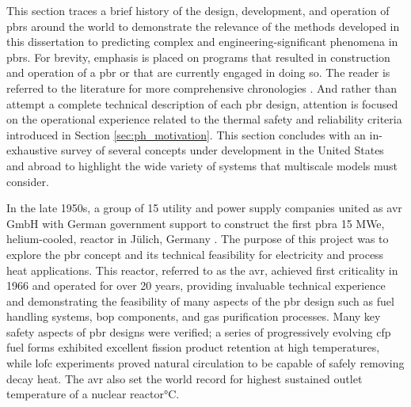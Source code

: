 This section traces a brief history of the design, development, and operation of \glspl{pbr} around the world to demonstrate the relevance of the methods developed in this dissertation to predicting complex and engineering-significant phenomena in \glspl{pbr}. For brevity, emphasis is placed on programs that resulted in construction and operation of a \gls{pbr} or that are currently engaged in doing so. The reader is referred to the literature for more comprehensive chronologies \cite{claxton,thomas}. And rather than attempt a complete technical description of each \gls{pbr} design, attention is focused on the operational experience related to the thermal safety and reliability criteria introduced in Section \ref{sec:ph_motivation}. This section concludes with an in-exhaustive survey of several concepts under development in the United States and abroad to highlight the wide variety of systems that multiscale models must consider.

In the late 1950s, a group of 15 utility and power supply companies united as \gls{avr} GmbH with German government support to construct the first \gls{pbr}\mdash a 15 MWe, helium-cooled, reactor in J{\"u}lich, Germany \cite{hecker,oehme,nrc_avr,moormann}. The purpose of this project was to explore the \gls{pbr} concept and its technical feasibility for electricity and process heat applications. This reactor, referred to as the \gls{avr}, achieved first criticality in 1966 and operated for over 20 years, providing invaluable technical experience and demonstrating the feasibility of many aspects of the \gls{pbr} design such as fuel handling systems, \gls{bop} components, and gas purification processes. Many key safety aspects of \gls{pbr} designs were verified; a series of progressively evolving \gls{cfp} fuel forms exhibited excellent fission product retention at high temperatures, while \gls{lofc} experiments proved natural circulation to be capable of safely removing decay heat. The \gls{avr} also set the world record for highest sustained outlet temperature of a nuclear reactor\si{\celsius}.

